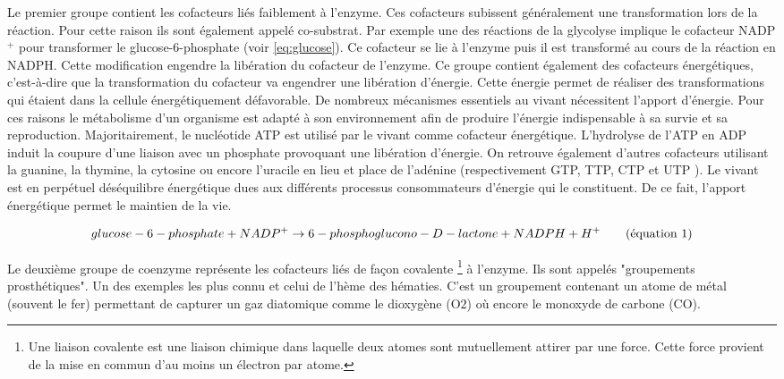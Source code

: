 \begin{refsegment}
    Le premier groupe contient les cofacteurs liés faiblement à l'enzyme. Ces cofacteurs subissent généralement une transformation lors de la réaction. Pour cette raison ils sont également appelé co-substrat. Par exemple une des réactions de la glycolyse implique le cofacteur NADP$^{+}$ pour transformer le glucose-6-phosphate (voir \cref{eq:glucose}). Ce cofacteur  se lie à l'enzyme puis il est transformé au cours de la réaction en NADPH. Cette modification engendre la libération du cofacteur de l'enzyme. Ce groupe contient également des cofacteurs énergétiques, c'est-à-dire que la transformation du cofacteur va engendrer une libération d'énergie. Cette énergie permet de réaliser des transformations qui étaient dans la cellule énergétiquement défavorable. De nombreux mécanismes essentiels au vivant nécessitent l'apport d'énergie. Pour ces raisons le métabolisme d'un organisme est adapté à son environnement afin de produire l'énergie indispensable à sa survie et sa reproduction. Majoritairement, le nucléotide \acrfull{ATP} est utilisé par le vivant comme cofacteur énergétique. L'hydrolyse de l'\acrfull{ATP} en \acrfull{ADP} induit la coupure d'une liaison avec un phosphate provoquant une libération d'énergie. On retrouve également d'autres cofacteurs utilisant la guanine, la thymine, la cytosine ou encore l'uracile en lieu et place de l'adénine (respectivement  GTP, TTP, CTP et UTP ). Le vivant est en perpétuel déséquilibre énergétique dues aux différents processus consommateurs d'énergie qui le constituent. De ce fait, l'apport énergétique permet le maintien de la vie.
    
    \begin{equation}\label{eq:glucose}
        glucose-6-phosphate + NADP^{+} \rightarrow 6-phosphoglucono-D-lactone + NADPH + H^{+}
        \stepcounter{equation}\tag{équation \theequation}
    \end{equation}
    
    Le deuxième groupe de coenzyme représente les cofacteurs liés de façon covalente \footnote{Une liaison covalente est une liaison chimique dans laquelle deux atomes sont mutuellement attirer par une force. Cette force provient de la mise en commun d'au moins un électron par atome.} à l'enzyme. Ils sont appelés "groupements prosthétiques". Un des exemples les plus connu et celui de l'hème des hématies. C'est un groupement contenant un atome de métal (souvent le fer) permettant de capturer un gaz diatomique comme le dioxygène (O${2}$) où encore le monoxyde de carbone (CO).
    

\end{refsegment}
